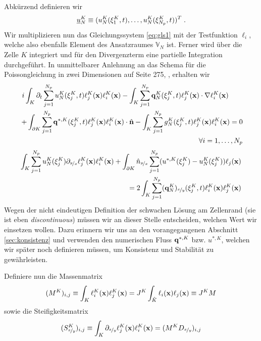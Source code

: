Abkürzend definieren wir
\begin{align}
  \underline{u}_N^K \equiv (u_N^K(\vb{\xi}_1^K, t),\dots, u_N^K(\vb{\xi}_{N_p}^K, t))^T \; .
\end{align}
Wir multiplizieren nun das Gleichungssystem \eqref{eq:gls1} mit der Testfunktion $\ell_i$, welche also ebenfalls Element des Ansatzraumes $\mathbb{V}_N$ ist. Ferner wird über die Zelle $K$ integriert und für den Divergenzterm eine partielle Integration durchgeführt. In unmittelbarer Anlehnung an das Schema für die Poissongleichung in zwei Dimensionen auf Seite 275, \cite{buch}, erhalten wir
\begin{align*}
  i\int_K \partial_t \sum_{j=1}^{N_p} u_N^K(\vb{\xi}_j^K, t)\ell_j^K(\vb{x}) \ell_i^K(\vb{x})
  - \int_K \sum_{j=1}^{N_p} \vb{q}_N^K(\vb{\xi}_j^K, t)\ell_j^K(\vb{x}) \cdot \nabla \ell_i^K(\vb{x}) \qquad \\
  \; + \int_{\partial K} \sum_{j=1}^{N_p} \vb{q}^{*,K}(\vb{\xi}_j^K, t)\ell_j^K(\vb{x}) \ell_i^K(\vb{x}) \cdot \hat{\vb{n}}
  - \int_K \sum_{j=1}^{N_p} g_N^K(\vb{\xi}_j^K, t)\ell_j^K(\vb{x}) \ell_i^K(\vb{x}) = 0 \\
  \forall i = 1,\dots,N_p
\end{align*}
\begin{align*}
  \int_K \sum_{j=1}^{N_p} u_N^K(\vb{\xi}_j^K) \partial_{\nicefrac{y}{x}} \ell_j^K(\vb{x})\ell_i^K(\vb{x}) + \int_{\partial K} \hat{n}_{\nicefrac{y}{x}} \sum_{j=1}^{N_p} (u^{*,K}(\vb{\xi}_j^K) -     u_N^K(\vb{\xi}_j^K))\ell_j(\vb{x})\\
   = 2 \int_K \sum_{j=1}^{N_p} (\vb{q}_N^K)_{\nicefrac{x}{y}} (\vb{\xi}_j^K, t) \ell_i^K(\vb{x})\ell_j^K(\vb{x})
\end{align*}
Wegen der nicht eindeutigen Definition der schwachen Lösung am Zellenrand (sie ist eben \emph{discontinuous}) müssen wir an dieser Stelle entscheiden, welchen Wert wir einsetzen wollen. Dazu erinnern wir uns an den vorangegangenen Abschnitt \ref{sec:konsistenz} und verwenden den numerischen Fluss $\vb{q}^{*,K}$ bzw. $u^{*,K}$, welchen wir später noch definieren müssen, um Konsistenz und Stabilität zu gewährleisten.

Definiere nun die Massenmatrix
\begin{align}
  (M^K)_{i,j} \equiv \int_K \ell_i^K(\vb{x})\ell_j^K(\vb{x}) = J^K \int_{\hat{K}}\ell_i(\vb{x}) \ell_j(\vb{x}) \equiv J^K M
  \label{eq:massenmatrix}
\end{align}
sowie die Steifigkeitsmatrix
\begin{align}
  (S^K_{\nicefrac{x}{y}})_{i,j} \equiv \int_K \partial_{\nicefrac{x}{y}} \ell_j^K(\vb{x})\ell_i^K(\vb{x}) = (M^K D_{\nicefrac{x}{y}})_{i,j}
  \label{eq:steifigkeitsmatrix}
\end{align}

